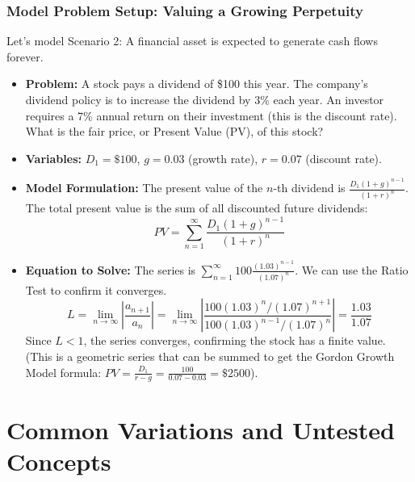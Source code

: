 \documentclass{article}
\begin{document}
\section{Model Problem Setup: Valuing a Growing Perpetuity}
Let's model Scenario 2: A financial asset is expected to generate cash flows forever.
\begin{itemize}
    \item \textbf{Problem:} A stock pays a dividend of \$100 this year. The company's dividend policy is to increase the dividend by 3\% each year. An investor requires a 7\% annual return on their investment (this is the discount rate). What is the fair price, or Present Value (PV), of this stock?
    \item \textbf{Variables:} $D_1 = \$100$, $g = 0.03$ (growth rate), $r = 0.07$ (discount rate).
    \item \textbf{Model Formulation:} The present value of the $n$-th dividend is $\frac{D_1 (1+g)^{n-1}}{(1+r)^n}$. The total present value is the sum of all discounted future dividends:
        \[ PV = \sum_{n=1}^{\infty} \frac{D_1 (1+g)^{n-1}}{(1+r)^n} \]
    \item \textbf{Equation to Solve:} The series is $\sum_{n=1}^{\infty} 100 \frac{(1.03)^{n-1}}{(1.07)^n}$. We can use the Ratio Test to confirm it converges.
    \[ L = \lim_{n \to \infty} \left| \frac{a_{n+1}}{a_n} \right| = \lim_{n \to \infty} \left| \frac{100(1.03)^n / (1.07)^{n+1}}{100(1.03)^{n-1} / (1.07)^n} \right| = \frac{1.03}{1.07} \]
    Since $L < 1$, the series converges, confirming the stock has a finite value. (This is a geometric series that can be summed to get the Gordon Growth Model formula: $PV = \frac{D_1}{r-g} = \frac{100}{0.07-0.03} = \$2500$).
\end{itemize}

\part{Common Variations and Untested Concepts}
\end{document}
